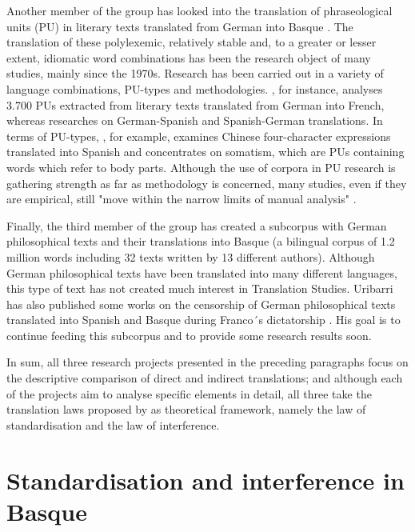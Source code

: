 \documentclass[output=paper]{LSP/langsci}
\begin{document}
Another member of the group has looked into the translation of phraseological units (PU) in literary texts translated from German into Basque \citep{Sanz2013}. The translation of these polylexemic, relatively stable and, to a greater or lesser extent, idiomatic word combinations has been the research object of many studies, mainly since the 1970s. Research has been carried out in a variety of language combinations, PU-types and methodologies. \citet{Higi1989}, for instance, analyses 3.700 PUs extracted from literary texts translated from German into French, whereas \citet{Segura1998} researches on German-Spanish and Spanish-German translations. In terms of PU-types, \citet{Ji2010}, for example, examines Chinese four-character expressions translated into Spanish and \citet{vanLawick2006} concentrates on somatism, which are PUs containing words which refer to body parts. Although the use of corpora in PU research is gathering strength as far as methodology is concerned, many studies, even if they are empirical, still "move within the narrow limits of manual analysis" \citep[843]{Marco2009}.

Finally, the third member of the group has created a subcorpus with German philosophical texts and their translations into Basque (a bilingual corpus of 1.2 million words including 32 texts written by 13 different authors). Although German philosophical texts have been translated into many different languages, this type of text has not created much interest in Translation Studies. Uribarri has also published some works on the censorship of German philosophical texts translated into Spanish and Basque during Franco´s dictatorship \citep{Uribarri2008,Uribarri2010}. His goal is to continue feeding this subcorpus and to provide some research results soon.

In sum, all three research projects presented in the preceding paragraphs focus on the descriptive comparison of direct and indirect translations; and although each of the projects aim to analyse specific elements in detail, all three take the translation laws proposed by  \citet{Toury2012} as theoretical framework, namely the law of standardisation and the law of interference.

\section{Standardisation and interference in Basque}
\end{document}
